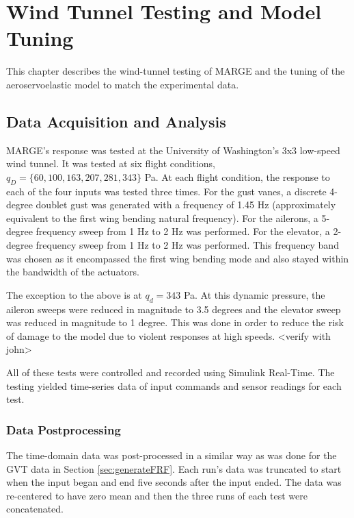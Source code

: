 \chapter{Wind Tunnel Testing and Model Tuning}
\label{ch:windTunnel}

This chapter describes the wind-tunnel testing of MARGE and the tuning of the aeroservoelastic model to match the experimental data.

\section{Data Acquisition and Analysis} %
\label{sec:wtDAQ}

MARGE's response was tested at the University of Washington's 3x3 low-speed wind tunnel. It was tested at six flight conditions, $q_D=\{60,100,163,207,281,343\}$ Pa. At each flight condition, the response to each of the four inputs was tested three times. For the gust vanes, a discrete 4-degree doublet gust was generated with a frequency of 1.45 Hz (approximately equivalent to the first wing bending natural frequency). For the ailerons, a 5-degree frequency sweep from 1 Hz to 2 Hz was performed. For the elevator, a 2-degree frequency sweep from 1 Hz to 2 Hz was performed. This frequency band was chosen as it encompassed the first wing bending mode and also stayed within the bandwidth of the actuators.

The exception to the above is at $q_d=343$ Pa. At this dynamic pressure, the aileron sweeps were reduced in magnitude to 3.5 degrees and the elevator sweep was reduced in magnitude to 1 degree. This was done in order to reduce the risk of damage to the model due to violent responses at high speeds. <verify with john>

All of these tests were controlled and recorded using Simulink Real-Time. The testing yielded time-series data of input commands and sensor readings for each test.

\subsection{Data Postprocessing}
The time-domain data was post-processed in a similar way as was done for the GVT data in Section \ref{sec:generateFRF}. Each run's data was truncated to start when the input began and end five seconds after the input ended. The data was re-centered to have zero mean and then the three runs of each test were concatenated.

